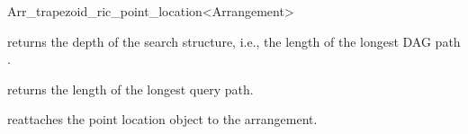 \begin{ccRefClass}{Arr_trapezoid_ric_point_location<Arrangement>}
\ccAccessFunctions

  {returns the depth of the search structure, i.e., the length of the longest DAG path .}

  {returns the length of the longest query path.}

\ccModifiers

  {reattaches the point location object to the arrangement.}


\end{ccRefClass}

\ccRefPageEnd
